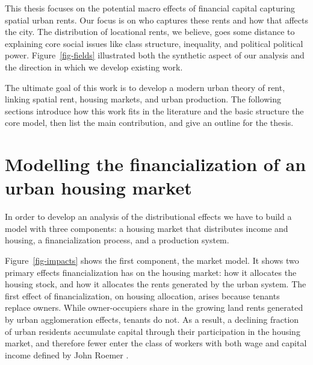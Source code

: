 This thesis focuses on the potential macro effects of financial capital capturing spatial urban rents.  %
Our focus is on who captures these rents and how that affects the city. The distribution of locational rents, we believe, goes some distance to explaining core social issues like class structure, inequality, and political political power.  Figure~\ref{fig-fields} illustrated both the synthetic aspect of our analysis and the direction in which we develop existing work. %

The ultimate goal of this work is to develop a modern urban theory of rent, linking spatial rent, housing markets, and urban production. The following sections introduce how this work fits in the literature and the basic structure the core model, then list the main contribution, and give an outline for the thesis.


\section{Modelling the financialization of an urban housing market}
In order to develop an analysis of the distributional effects we have to build a model with three components: a housing market that distributes income and housing, a financialization process, and a production system. 

Figure~\ref{fig-impacts} shows the first component, the market model.
It shows two primary effects financialization has on the housing market: how it allocates %
the housing stock, and how it allocates the \glspl{rent} generated by the urban system. %
The first effect of financialization, on housing allocation, arises because tenants replace owners. While owner-occupiers share in the growing land rents generated by urban agglomeration effects, tenants do not. As a result, a declining fraction of urban residents accumulate capital through their participation in the housing market, and therefore fewer enter the class of workers with both wage and capital income defined by John Roemer \cite{roemerGeneralTheoryExploitation1982}. 

